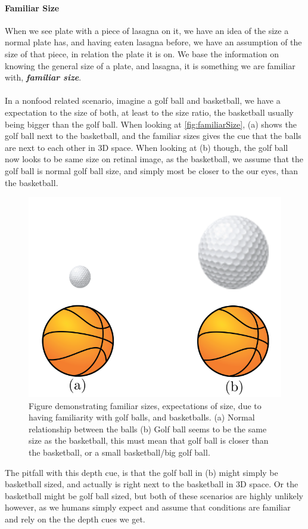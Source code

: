 			\paragraph{Familiar Size}
				When we see plate with a piece of lasagna on it, we have an idea of the size a normal plate has, and having eaten lasagna before, we have an assumption of the size of that piece, in relation the plate it is on. We base the information on knowing the general size of a plate, and lasagna, it is something we are familiar with, \textbf{\textit{familiar size}}.\\\\ In a nonfood related scenario, imagine a golf ball and basketball, we have a expectation to the size of both, at least to the size ratio, the basketball usually being bigger than the golf ball. When looking at \autoref{fig:familiarSize}, (a) shows the golf ball next to the basketball, and the familiar sizes gives the cue that the balls are next to each other in 3D space. When looking at (b) though, the golf ball now looks to be same size on retinal image, as the basketball, we assume that the golf ball is normal golf ball size, and simply most be closer to the our eyes, than the basketball.
				\begin{figure}[H]
					\centering
					\includegraphics[width=0.5\linewidth]{figure/familiarSize}
					\caption{Figure demonstrating familiar sizes, expectations of size, due to having familiarity with golf balls, and basketballs. (a) Normal relationship between the balls (b) Golf ball seems to be the same size as the basketball, this must mean that golf ball is closer than the basketball, or a small basketball/big golf ball.}
					\label{fig:familiarSize}
				\end{figure}
				The pitfall with this depth cue, is that the golf ball in (b) might simply be basketball sized, and actually is right next to the basketball in 3D space. Or the basketball might be golf ball sized, but both of these scenarios are highly unlikely however, as we humans simply expect and assume that conditions are familiar and rely on the the depth cues we get.
